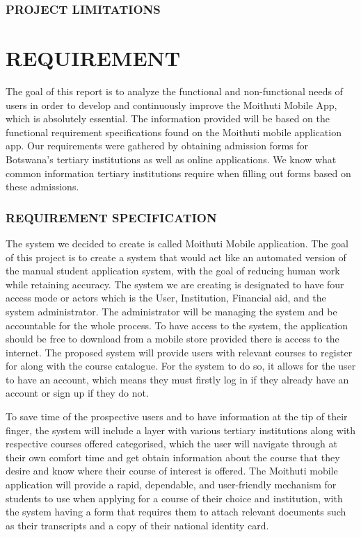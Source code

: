 \subsubsection{PROJECT LIMITATIONS}

\section{REQUIREMENT}
The goal of this report is to analyze the functional and non-functional needs of users in order to develop and continuously improve the Moithuti Mobile App, which is absolutely essential. The information provided will be based on the functional requirement specifications found on the Moithuti mobile application app. Our requirements were gathered by obtaining admission forms for Botswana's tertiary institutions as well as online applications. We know what common information tertiary institutions require when filling out forms based on these admissions.

\subsubsection{REQUIREMENT SPECIFICATION}
The system we decided to create is called Moithuti Mobile application. The goal of this project is to create a system that would act like an automated version of the manual student application system, with the goal of reducing human work while retaining accuracy. The system we are creating is designated to have four access mode or actors which is the User, Institution, Financial aid, and the system administrator. The administrator will be managing the system and be accountable for the whole process. To have access to the system, the application should be free to download from a mobile store provided there is access to the internet. The proposed system will provide users with relevant courses to register for along with the course catalogue. For the system to do so, it allows for the user to have an account, which means they must firstly log in if they already have an account or sign up if they do not.

To save time of the prospective users and to have information at the tip of their finger, the system will include a layer with various tertiary institutions along with respective courses offered categorised, which the user will navigate through at their own comfort time and get obtain information about the course that they desire and know where their course of interest is offered. The Moithuti mobile application will provide a rapid, dependable, and user-friendly mechanism for students to use when applying for a course of their choice and institution, with the system having a form that requires them to attach relevant documents such as their transcripts and a copy of their national identity card. 

